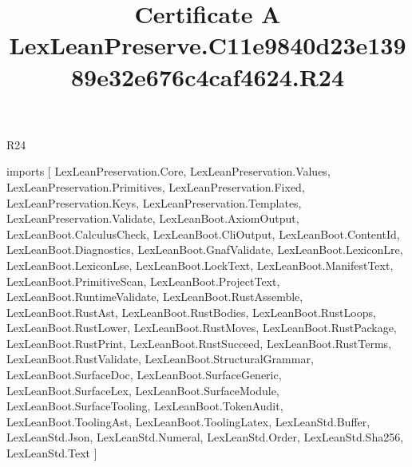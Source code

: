 \begin{lexlean}{R24}
\title{Certificate A LexLeanPreserve.C11e9840d23e13989e32e676c4caf4624.R24}
\begin{coremodule}
imports [
  LexLeanPreservation.Core,
  LexLeanPreservation.Values,
  LexLeanPreservation.Primitives,
  LexLeanPreservation.Fixed,
  LexLeanPreservation.Keys,
  LexLeanPreservation.Templates,
  LexLeanPreservation.Validate,
  LexLeanBoot.AxiomOutput,
  LexLeanBoot.CalculusCheck,
  LexLeanBoot.CliOutput,
  LexLeanBoot.ContentId,
  LexLeanBoot.Diagnostics,
  LexLeanBoot.GnafValidate,
  LexLeanBoot.LexiconLre,
  LexLeanBoot.LexiconLse,
  LexLeanBoot.LockText,
  LexLeanBoot.ManifestText,
  LexLeanBoot.PrimitiveScan,
  LexLeanBoot.ProjectText,
  LexLeanBoot.RuntimeValidate,
  LexLeanBoot.RustAssemble,
  LexLeanBoot.RustAst,
  LexLeanBoot.RustBodies,
  LexLeanBoot.RustLoops,
  LexLeanBoot.RustLower,
  LexLeanBoot.RustMoves,
  LexLeanBoot.RustPackage,
  LexLeanBoot.RustPrint,
  LexLeanBoot.RustSucceed,
  LexLeanBoot.RustTerms,
  LexLeanBoot.RustValidate,
  LexLeanBoot.StructuralGrammar,
  LexLeanBoot.SurfaceDoc,
  LexLeanBoot.SurfaceGeneric,
  LexLeanBoot.SurfaceLex,
  LexLeanBoot.SurfaceModule,
  LexLeanBoot.SurfaceTooling,
  LexLeanBoot.TokenAudit,
  LexLeanBoot.ToolingAst,
  LexLeanBoot.ToolingLatex,
  LexLeanStd.Buffer,
  LexLeanStd.Json,
  LexLeanStd.Numeral,
  LexLeanStd.Order,
  LexLeanStd.Sha256,
  LexLeanStd.Text
]


\end{coremodule}
\end{lexlean}
